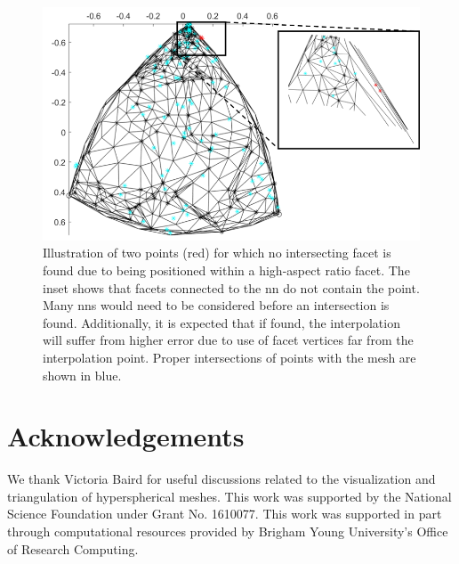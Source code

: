\documentclass[final,12pt]{elsarticle}
\begin{document}
\begin{figure}
	\centering
	\includegraphics[scale=0.8]{figures/high-aspect-non-int.png}
	\caption{Illustration of two \outpt{} points (red) for which no intersecting facet is found due to being positioned within a high-aspect ratio facet. The inset shows that facets connected to the \gls{nn} do not contain the \outpt{} point. Many \glspl{nn} would need to be considered before an intersection is found. Additionally, it is expected that if found, the interpolation will suffer from higher error due to use of facet vertices far from the interpolation point. Proper intersections of \outpt{} points with the mesh are shown in blue.}
	\label{fig:high-aspect-non-int}
\end{figure}
%
%
\section*{Acknowledgements}
We thank Victoria Baird for useful discussions related to the visualization and triangulation of hyperspherical meshes. This work was supported by the National Science Foundation under Grant No. 1610077. This work was supported in part through computational resources provided by Brigham Young University's Office of Research Computing.
%

\begingroup
    \setlength{\bibsep}{10pt}
    
\endgroup
\end{document}
